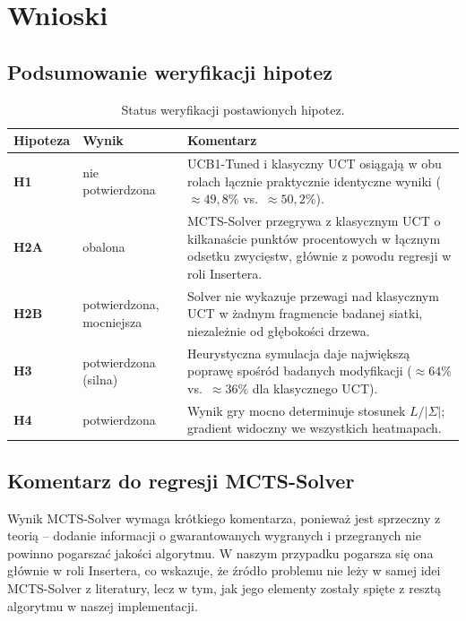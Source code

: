 \documentclass{article}
\begin{document}
\section{Wnioski}

\subsection{Podsumowanie weryfikacji hipotez}

\begin{table}[H]
\centering
\begin{tabular}{>{\bfseries}l p{3.4cm} p{8cm}}
\toprule
Hipoteza & Wynik & Komentarz \\
\midrule
H1 & nie potwierdzona & UCB1-Tuned i klasyczny UCT osiągają w obu rolach
łącznie praktycznie identyczne wyniki ($\approx 49{,}8\%$ vs.\
$\approx 50{,}2\%$). \\
H2A & obalona & MCTS-Solver przegrywa z klasycznym UCT o kilkanaście
punktów procentowych w łącznym odsetku zwycięstw, głównie z powodu
regresji w roli Insertera. \\
H2B & potwierdzona, mocniejsza & Solver nie wykazuje przewagi nad
klasycznym UCT w żadnym fragmencie badanej siatki, niezależnie od
głębokości drzewa. \\
H3 & potwierdzona (silna) & Heurystyczna symulacja daje największą
poprawę spośród badanych modyfikacji ($\approx 64\%$ vs.\ $\approx 36\%$
dla klasycznego UCT). \\
H4 & potwierdzona & Wynik gry mocno determinuje stosunek
$L/|\Sigma|$; gradient widoczny we wszystkich heatmapach. \\
\bottomrule
\end{tabular}
\caption{Status weryfikacji postawionych hipotez.}
\end{table}

\subsection{Komentarz do regresji MCTS-Solver}

Wynik MCTS-Solver wymaga krótkiego komentarza, ponieważ jest sprzeczny
z teorią -- dodanie informacji o gwarantowanych wygranych i przegranych
nie powinno pogarszać jakości algorytmu. W naszym przypadku pogarsza
się ona głównie w roli Insertera, co wskazuje, że źródło problemu nie
leży w samej idei MCTS-Solver z literatury, lecz w tym, jak jego
elementy zostały spięte z resztą algorytmu w naszej implementacji.
\end{document}
